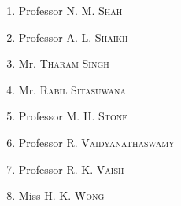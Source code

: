 \begin{enumerate}
\item Professor \textsc{N. M. Shah}

\item Professor \textsc{A. L. Shaikh}

\item Mr. \textsc{Tharam Singh}

\item Mr. \textsc{Rabil Sitasuwana}

\item Professor \textsc{M. H. Stone}

\item Professor \textsc{R. Vaidyanathaswamy}

\item Professor \textsc{R. K. Vaish}

\item Miss \textsc{H. K. Wong} 
\end{enumerate}

